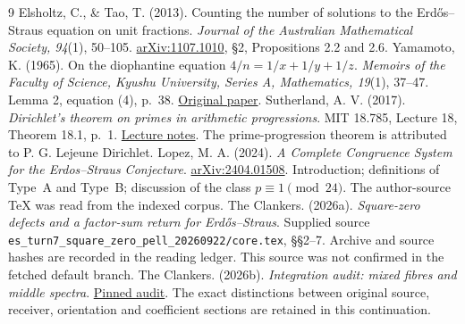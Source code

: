 \begin{thebibliography}{9}
 Elsholtz, C., \& Tao, T. (2013).
Counting the number of solutions to the Erd\H{o}s--Straus equation on unit fractions.
\emph{Journal of the Australian Mathematical Society, 94}(1), 50--105.
\href{https://arxiv.org/abs/1107.1010}{arXiv:1107.1010}, \S2, Propositions 2.2 and 2.6.
 Yamamoto, K. (1965).
On the diophantine equation $4/n=1/x+1/y+1/z$.
\emph{Memoirs of the Faculty of Science, Kyushu University, Series A, Mathematics,
19}(1), 37--47. Lemma 2, equation (4), p.~38.
\href{https://www.jstage.jst.go.jp/article/kyushumfs/19/1/19_1_37/_pdf/-char/en}{Original paper}.
 Sutherland, A. V. (2017).
\emph{Dirichlet's theorem on primes in arithmetic progressions}.
MIT 18.785, Lecture 18, Theorem 18.1, p.~1.
\href{https://math.mit.edu/classes/18.785/2017fa/LectureNotes18.pdf}{Lecture notes}.
The prime-progression theorem is attributed to P. G. Lejeune Dirichlet.
 Lopez, M. A. (2024).
\emph{A Complete Congruence System for the Erdos--Straus Conjecture}.
\href{https://arxiv.org/abs/2404.01508}{arXiv:2404.01508}.
Introduction; definitions of Type~A and Type~B; discussion of the class
$p\equiv1\pmod{24}$. The author-source TeX was read from the indexed corpus.
 The Clankers. (2026a).
\emph{Square-zero defects and a factor-sum return for Erd\H{o}s--Straus}.
Supplied source \texttt{es\_turn7\_square\_zero\_pell\_20260922/core.tex},
\S\S2--7. Archive and source hashes are recorded in the reading ledger.
This source was not confirmed in the fetched default branch.
 The Clankers. (2026b).
\emph{Integration audit: mixed fibres and middle spectra}.
\href{https://github.com/KokunoYumeto/erdos-straus-foundation/blob/20709bee872ad10e4cc7d7b976d975e24532a803/research/incoming/es-turn07-fibres-middle-spectrum-20260922/INTEGRATION_AUDIT.md}{Pinned audit}.
The exact distinctions between original source, receiver, orientation and
coefficient sections are retained in this continuation.
\end{thebibliography}
